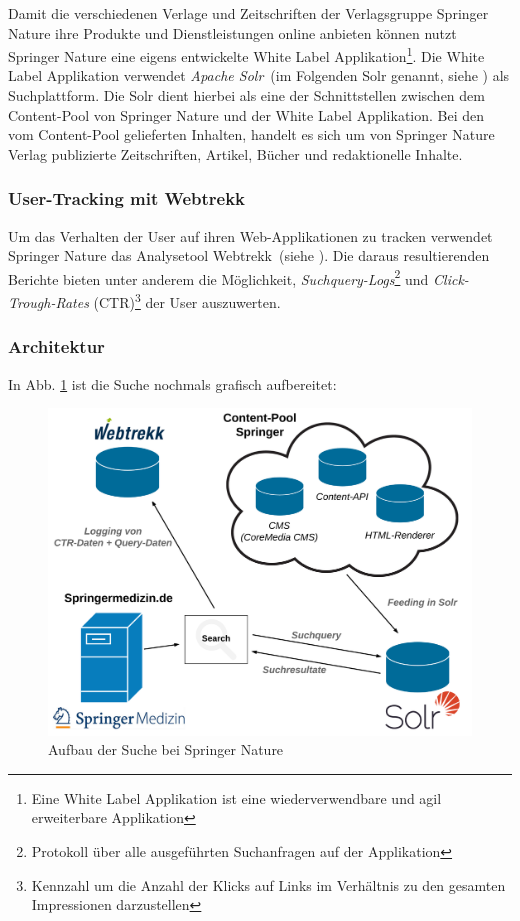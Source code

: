 Damit die verschiedenen Verlage und Zeitschriften der Verlagsgruppe Springer Nature ihre Produkte und Dienstleistungen online anbieten können nutzt Springer Nature eine eigens entwickelte White Label Applikation\footnote{Eine White Label Applikation ist eine wiederverwendbare und agil erweiterbare Applikation}. Die White Label Applikation verwendet \textit{Apache Solr}~(im Folgenden \glqq Solr\grqq{} genannt, siehe \cite{solr}) als Suchplattform. Die Solr dient hierbei als eine der Schnittstellen zwischen dem Content-Pool von Springer Nature und der White Label Applikation. Bei den vom Content-Pool gelieferten Inhalten, handelt es sich um von Springer Nature Verlag publizierte Zeitschriften, Artikel, Bücher und redaktionelle Inhalte.

\subsubsection{User-Tracking mit Webtrekk}
\label{sec:Einfuehrung:AufbauSucheBeiSpringerNature:Webtrekk}

Um das Verhalten der User auf ihren Web-Applikationen zu tracken verwendet Springer Nature das Analysetool Webtrekk~(siehe \cite{webtrekk}). Die daraus resultierenden Berichte bieten unter anderem die Möglichkeit, \textit{Suchquery-Logs}\footnote{Protokoll über alle ausgeführten Suchanfragen auf der Applikation} und \textit{Click-Trough-Rates} (CTR)\footnote{Kennzahl um die Anzahl der Klicks auf Links im Verhältnis zu den gesamten Impressionen darzustellen} der User auszuwerten.

\pagebreak

\subsubsection{Architektur}
\label{sec:Einfuehrung:AufbauSucheBeiSpringerNature:Architektur}

In Abb. \ref{fig:SucheSpringerNature} ist die Suche nochmals grafisch aufbereitet:

\begin{figure}[H]
\centering
\vspace{-1.25em}
\caption[Aufbau der Suche bei Springer Nature]{Aufbau der Suche bei Springer Nature}
\vspace{.5em}
\label{fig:SucheSpringerNature}
\includegraphics[width=0.5\linewidth]{gfx/AufbauSucheSpringerNature}
\vspace{-2em}
\end{figure}

